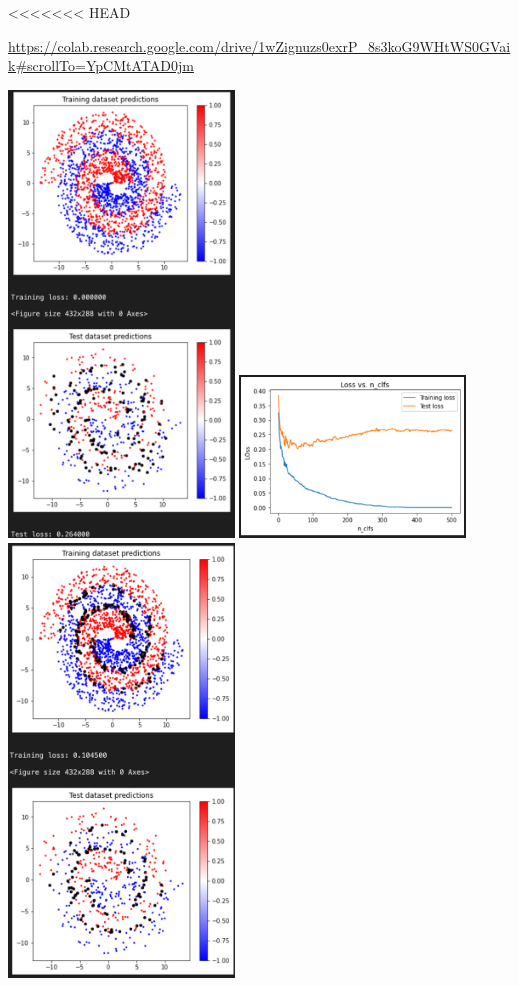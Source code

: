 <<<<<<< HEAD
\begin{solution}
    \url{https://colab.research.google.com/drive/1wZignuzs0exrP_8s3koG9WHtWS0GVaik#scrollTo=YpCMtATAD0jm}
    \begin{center}
        \includegraphics[width=0.45\textwidth]{GB1.png}
        \includegraphics[width=0.45\textwidth]{GB2.png}
        \includegraphics[width=0.45\textwidth]{ada1.png}

\end{center}
\end{solution}
